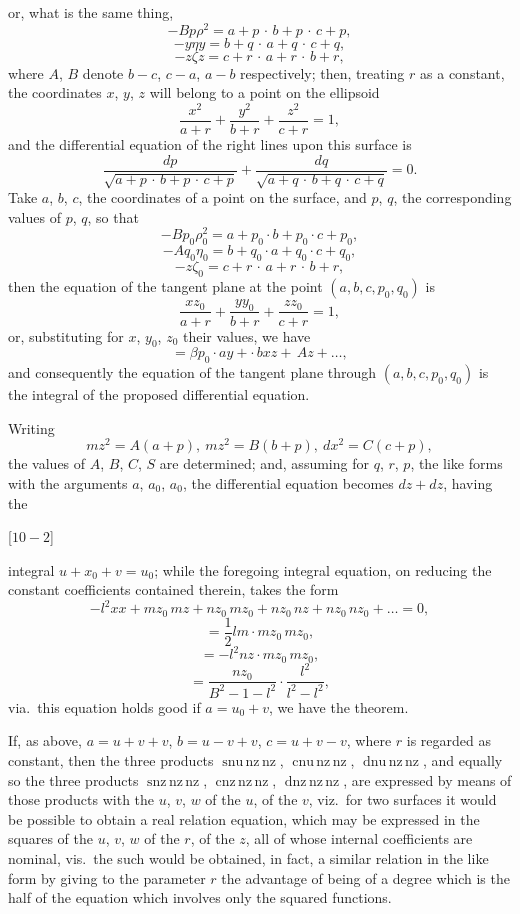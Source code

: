 \documentclass[12pt,a4paper,oneside]{book}
\newcommand{\paperref}[1]{\par\noindent\hfill[#1]\hfill\null\par}
\theoremstyle{plain}
\theoremstyle{definition}
\theoremstyle{remark}
\begin{document}
\newpage
or, what is the same thing,
\[
-Bp\rho^2=a+p\,\cdot\,b+p\,\cdot\,c+p,
\]
\[
-y\eta y=b+q\,\cdot\,a+q\,\cdot\,c+q,
\]
\[
-z\zeta z=c+r\,\cdot\,a+r\,\cdot\,b+r,
\]
where $A$, $B$ denote $b-c$, $c-a$, $a-b$ respectively; then, treating $r$ as a constant, the coordinates $x$, $y$, $z$ will belong to a point on the ellipsoid
\[
\frac{x^2}{a+r}+\frac{y^2}{b+r}+\frac{z^2}{c+r}=1,
\]
and the differential equation of the right lines upon this surface is
\[
\frac{dp}{\sqrt{a+p\,\cdot\,b+p\,\cdot\,c+p}}+\frac{dq}{\sqrt{a+q\,\cdot\,b+q\,\cdot\,c+q}}=0.
\]
Take $a$, $b$, $c$, the coordinates of a point on the surface, and $p$, $q$, the corresponding values of $p$, $q$, so that
\[
-Bp_0\rho_0^2=a+p_0\cdot b+p_0\cdot c+p_0,
\]
\[
-Aq_0\eta_0=b+q_0\cdot a+q_0\cdot c+q_0,
\]
\[
-z\zeta_0=c+r\,\cdot\,a+r\,\cdot\,b+r,
\]
then the equation of the tangent plane at the point $(a, b, c, p_0, q_0)$ is
\[
\frac{x z_0}{a+r}+\frac{y y_0}{b+r}+\frac{z z_0}{c+r}=1,
\]
or, substituting for $x$, $y_0$, $z_0$ their values, we have
\[
=\beta p_0 \cdot ay+\cdot\,bxz+\,Az+\dots,
\]
and consequently the equation of the tangent plane through $(a, b, c, p_0, q_0)$ is the integral of the proposed differential equation.

Writing
\[
mz^2=A(a+p),\ mz^2=B(b+p),\ dx^2=C(c+p),
\]
the values of $A$, $B$, $C$, $S$ are determined; and, assuming for $q$, $r$, $p$, the like forms with the arguments $a$, $a_0$, $a_0$, the differential equation becomes $dz+dz$, having the
\paperref{\hfill $10-2$}

\newpage
integral $u+x_0+v=u_0$; while the foregoing integral equation, on reducing the constant coefficients contained therein, takes the form
\[
-l^2 xx+mz_0\,mz+nz_0\,mz_0+nz_0\,nz+nz_0\,nz_0+\dots=0,
\]
\[
=
\frac{1}{2}lm\cdot mz_0\,mz_0,
\]
\[
=-l^2 nz \cdot mz_0\,mz_0,
\]
\[
=\frac{nz_0}{B^2-1-l^2}\cdot\frac{l^2}{l^2-l^2},
\]
via.\ this equation holds good if $a=u_0+v$, we have the theorem.

If, as above, $a=u+v+v$, $b=u-v+v$, $c=u+v-v$, where $r$ is regarded as constant, then the three products $\operatorname{snu\,nz\,nz}$, $\operatorname{cnu\,nz\,nz}$, $\operatorname{dnu\,nz\,nz}$, and equally so the three products $\operatorname{snz\,nz\,nz}$, $\operatorname{cnz\,nz\,nz}$, $\operatorname{dnz\,nz\,nz}$, are expressed by means of those products with the $u$, $v$, $w$ of the $u$, of the $v$, viz.\ for two surfaces it would be possible to obtain a real relation equation, which may be expressed in the squares of the $u$, $v$, $w$ of the $r$, of the $z$, all of whose internal coefficients are nominal, vis.\ the such would be obtained, in fact, a similar relation in the like form by giving to the parameter $r$ the advantage of being of a degree which is the half of the equation which involves only the squared functions.
\end{document}

